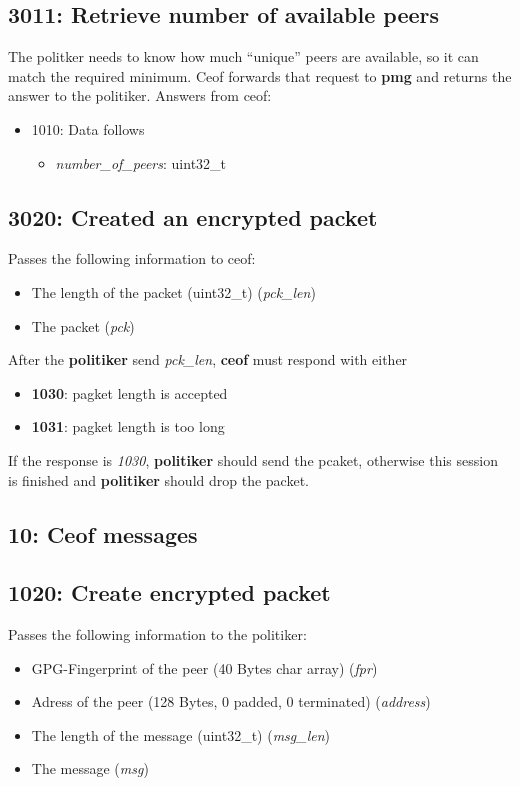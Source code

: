 \documentclass[12pt,a4paper]{book}
\begin{document}
\subsection{3011: Retrieve number of available peers}
The politker needs to know how much "`unique"' peers are available,
so it can match the required minimum.
Ceof forwards that request to \textbf{pmg} and returns the answer to the
politiker.
Answers from ceof:
\begin{itemize}
\item 1010: Data follows
\begin{itemize}
\item \textit{number\_of\_peers}: uint32\_t
\end{itemize}
\end{itemize}
\subsection{3020: Created an encrypted packet}
Passes the following information to ceof:
\begin{itemize}
\item The length of the packet (uint32\_t) (\textit{pck\_len})
\item The packet (\textit{pck})
\end{itemize}

After the \textbf{politiker} send \textit{pck\_len},
\textbf{ceof} must respond with either
\begin{itemize}
\item \textbf{1030}: pagket length is accepted
\item \textbf{1031}: pagket length is too long
\end{itemize}

If the response is \textit{1030}, \textbf{politiker} should send the
pcaket, otherwise this session is finished and \textbf{politiker}
should drop the packet.
\subsection{10: Ceof messages}
\subsection{1020: Create encrypted packet}
Passes the following information to the politiker:
\begin{itemize}
\item GPG-Fingerprint of the peer (40 Bytes char array) (\textit{fpr})
\item Adress of the peer (128 Bytes, 0 padded, 0 terminated) (\textit{address})
\item The length of the message (uint32\_t) (\textit{msg\_len})
\item The message (\textit{msg})
\end{itemize}
\end{document}
